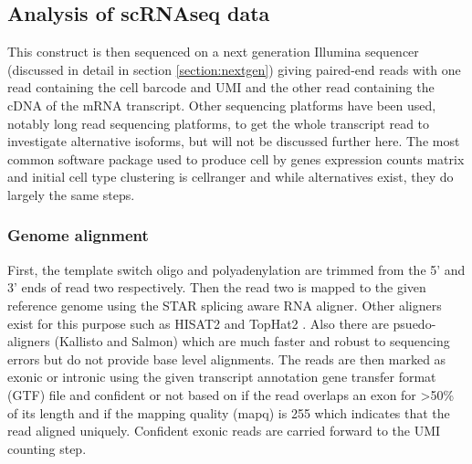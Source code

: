 \subsection{Analysis of scRNAseq data}

\par{
This construct is then sequenced on a next generation Illumina sequencer \cite{bridgeamp}\cite{illuminareview} (discussed in detail in section \ref{section:nextgen}) giving paired-end reads with one read containing the cell barcode and UMI and the other read containing the cDNA of the mRNA transcript. Other sequencing platforms have been used, notably long read sequencing platforms, to get the whole transcript read to investigate alternative isoforms, but will not be discussed further here\cite{tilgner}\cite{isoformseq}\cite{longreadsinglecell}. The most common software package used to produce cell by genes expression counts matrix and initial cell type clustering is cellranger\cite{cellranger} and while alternatives exist\cite{dropseqsoft}, they do largely the same steps. 
}

\subsubsection{Genome alignment}

\par{
First, the template switch oligo and polyadenylation are trimmed from the 5' and 3' ends of read two respectively. Then the read two is mapped to the given reference genome using the STAR splicing aware RNA aligner\cite{STAR}. Other aligners exist for this purpose such as HISAT2 \cite{hisat} and TopHat2 \cite{tophat2}. Also there are psuedo-aligners (Kallisto\cite{kallisto} and Salmon\cite{salmon}) which are much faster and robust to sequencing errors but do not provide base level alignments\cite{alignfree}. The reads are then marked as exonic or intronic using the given transcript annotation gene transfer format (GTF) file and confident or not based on if the read overlaps an exon for >50\% of its length and if the mapping quality (mapq) is 255 which indicates that the read aligned uniquely. Confident exonic reads are carried forward to the UMI counting step\cite{singlecelloverview}.
}

